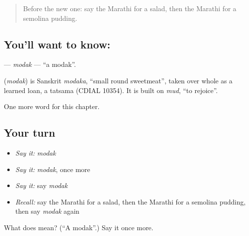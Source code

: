 \label{lesson:MR-C186-modak}



\begin{quote}
Before the new one: say the Marathi for a salad, then the Marathi for a semolina pudding.
\end{quote}

\subsection*{You'll want to know: }
\textbf{} — \emph{modak} — \textquotedblleft{}a modak\textquotedblright{}.

\begin{cousinweb}
\textbf{} (\emph{modak}) is Sanskrit \emph{modaka}, \textquotedblleft{}small round sweetmeat\textquotedblright{}, taken over whole as a learned loan, a tatsama (CDIAL 10354). It is built on \emph{mud}, \textquotedblleft{}to rejoice\textquotedblright{}.
\end{cousinweb}

\begin{grammarlens}[title={What you've built}]
One more word for this chapter.
\end{grammarlens}

\subsection*{Your turn}
\begin{itemize}
\raggedright
  \item \emph{Say it:} \emph{modak}
  \item \emph{Say it:} \emph{modak}, once more
  \item \emph{Say it:} say \emph{modak}
  \item \emph{Recall:} say the Marathi for a salad, then the Marathi for a semolina pudding, then say \emph{modak} again
\end{itemize}

\begin{tcolorbox}[breakable,colback=teal!4,colframe=teal!35!black,title={Before you move on}]
What does  mean? (\textquotedblleft{}A modak\textquotedblright{}.) Say it once more.
\end{tcolorbox}
